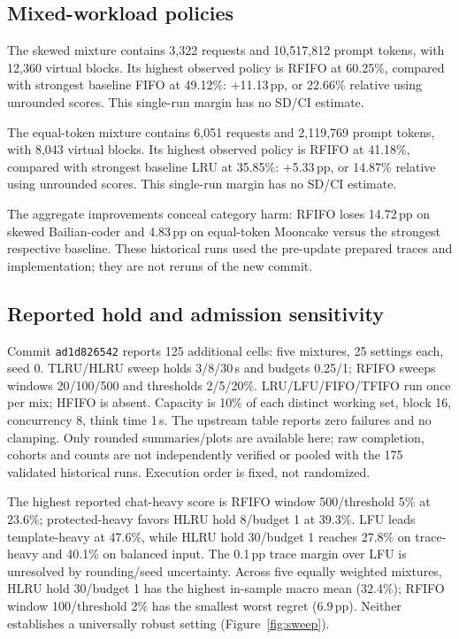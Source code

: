 \documentclass{article}
\begin{document}
\subsection{Mixed-workload policies}
The skewed mixture contains 3,322 requests and 10,517,812 prompt tokens, with 12,360 virtual blocks. Its highest observed policy is RFIFO at 60.25\%, compared with strongest baseline FIFO at 49.12\%: +11.13\,pp, or 22.66\% relative using unrounded scores. This single-run margin has no SD/CI estimate.

The equal-token mixture contains 6,051 requests and 2,119,769 prompt tokens, with 8,043 virtual blocks. Its highest observed policy is RFIFO at 41.18\%, compared with strongest baseline LRU at 35.85\%: +5.33\,pp, or 14.87\% relative using unrounded scores. This single-run margin has no SD/CI estimate.

The aggregate improvements conceal category harm: RFIFO loses 14.72\,pp on skewed Bailian-coder and 4.83\,pp on equal-token Mooncake versus the strongest respective baseline. These historical runs used the pre-update prepared traces and implementation; they are not reruns of the new commit.

\subsection{Reported hold and admission sensitivity}
Commit \texttt{ad1d826542} reports 125 additional cells: five mixtures, 25 settings each, seed 0. TLRU/HLRU sweep holds 3/8/30\,s and budgets 0.25/1; RFIFO sweeps windows 20/100/500 and thresholds 2/5/20\%. LRU/LFU/FIFO/TFIFO run once per mix; HFIFO is absent. Capacity is 10\% of each distinct working set, block 16, concurrency 8, think time 1\,s. The upstream table reports zero failures and no clamping. Only rounded summaries/plots are available here; raw completion, cohorts and counts are not independently verified or pooled with the 175 validated historical runs. Execution order is fixed, not randomized.

The highest reported chat-heavy score is RFIFO window 500/threshold 5\% at 23.6\%; protected-heavy favors HLRU hold 8/budget 1 at 39.3\%. LFU leads template-heavy at 47.6\%, while HLRU hold 30/budget 1 reaches 27.8\% on trace-heavy and 40.1\% on balanced input. The 0.1\,pp trace margin over LFU is unresolved by rounding/seed uncertainty. Across five equally weighted mixtures, HLRU hold 30/budget 1 has the highest in-sample macro mean (32.4\%); RFIFO window 100/threshold 2\% has the smallest worst regret (6.9\,pp). Neither establishes a universally robust setting (Figure~\ref{fig:sweep}).
\end{document}
